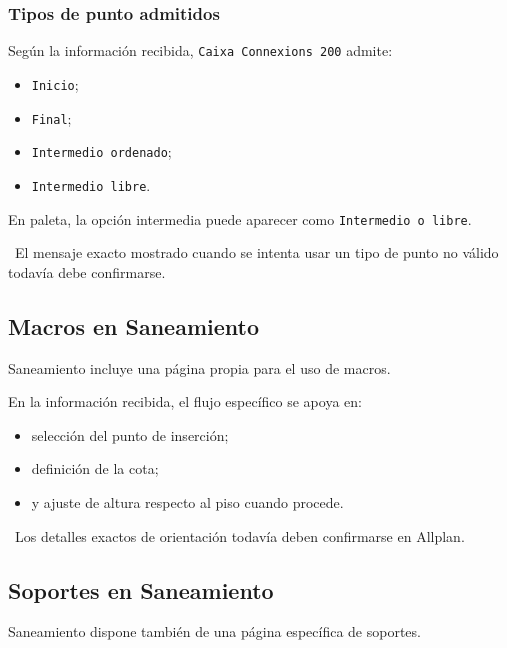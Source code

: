 
\subsubsection{Tipos de punto admitidos}

Según la información recibida, \texttt{Caixa Connexions 200} admite:

\begin{itemize}
\item \texttt{Inicio};
\item \texttt{Final};
\item \texttt{Intermedio ordenado};
\item \texttt{Intermedio libre}.
\end{itemize}

En paleta, la opción intermedia puede aparecer como \texttt{Intermedio o libre}.

\pendingtag\ El mensaje exacto mostrado cuando se intenta usar un tipo de punto no válido todavía debe confirmarse.

\subsection{Macros en Saneamiento}

Saneamiento incluye una página propia para el uso de macros.

En la información recibida, el flujo específico se apoya en:

\begin{itemize}
\item selección del punto de inserción;
\item definición de la cota;
\item y ajuste de altura respecto al piso cuando procede.
\end{itemize}

\pendingtag\ Los detalles exactos de orientación todavía deben confirmarse en Allplan.


\subsection{Soportes en Saneamiento}

Saneamiento dispone también de una página específica de soportes.

